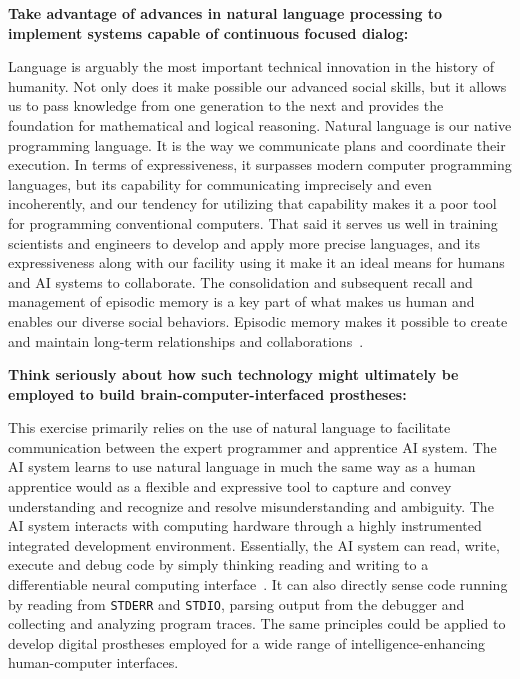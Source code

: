{\bf{Take advantage of advances in natural language processing to implement systems capable of continuous focused dialog:}}

Language is arguably the most important technical innovation in the history of humanity. Not only does it make possible our advanced social skills, but it allows us to pass knowledge from one generation to the next and provides the foundation for mathematical and logical reasoning. Natural language is our native programming language. It is the way we communicate plans and coordinate their execution. In terms of expressiveness, it surpasses modern computer programming languages, but its capability for communicating imprecisely and even incoherently, and our tendency for utilizing that capability makes it a poor tool for programming conventional computers. That said it serves us well in training scientists and engineers to develop and apply more precise languages, and its expressiveness along with our facility using it make it an ideal means for humans and AI systems to collaborate. The consolidation and subsequent recall and management of episodic memory is a key part of what makes us human and enables our diverse social behaviors. Episodic memory makes it possible to create and maintain long-term relationships and collaborations~\cite{PritzeletalICML-17,MoscovitchetalARP-16,OReillyetalCS-15}.


{\bf{Think seriously about how such technology might ultimately be employed to build brain-computer-interfaced prostheses:}}

This exercise primarily relies on the use of natural language to facilitate communication between the expert programmer and apprentice AI system. The AI system learns to use natural language in much the same way as a human apprentice would \emdash{} as a flexible and expressive tool to capture and convey understanding and recognize and resolve misunderstanding and ambiguity. The AI system interacts with computing hardware through a highly instrumented integrated development environment. Essentially, the AI system can read, write, execute and debug code by simply thinking \emdash{} reading and writing to a differentiable neural computing interface~\cite{GravesetalNATURE-16}. It can also directly sense code running by reading from {\tt{STDERR}} and {\tt{STDIO}}, parsing output from the debugger and collecting and analyzing program traces. The same principles could be applied to develop digital prostheses employed for a wide range of intelligence-enhancing human-computer interfaces.

